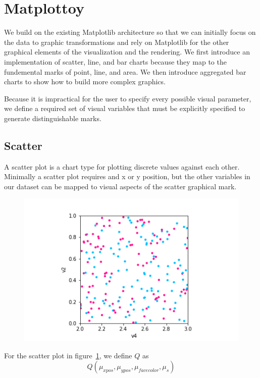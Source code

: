 \documentclass[../main.tex]{subfiles}
\begin{document}
    

\section{Matplottoy}

We build on the existing Matplotlib architecture \cite{hunterMatplotlib2DGraphics2007} so that we can initially focus on the data to graphic transformations and rely on Matplotlib for the other graphical elements of the visualization and the rendering. We first introduce an implementation of scatter, line, and bar charts because they map to the fundemental marks of point, line, and area. We then introduce aggregated bar charts to show how to build more complex graphics.  

Because it is impractical for the user to specify every possible visual parameter, we define a required set of visual variables that must be explicitly specified to generate distinguishable marks. 


\subsection{Scatter}
 A scatter plot \cite{friendlyBriefHistoryData2006a,tukeyExploratoryDataAnalysis1977} is a chart type for plotting discrete values against each other. Minimally a scatter plot requires and x or y position, but the other variables in our dataset can be mapped to visual aspects of the scatter graphical mark. 
\begin{figure}[H]
    \includegraphics[width=\textwidth]{figures/code/scatter_0.png}
    \label{fig:scatter}
\end{figure}

For the scatter plot in figure~\ref{fig:scatter}, we define $Q$ as 
 \begin{equation}
    Q(\mu_{xpos}, \mu_{ypos}, \mu_{facecolor}, \mu_{s})
    \label{eq:scatter}
 \end{equation}
\end{document}
